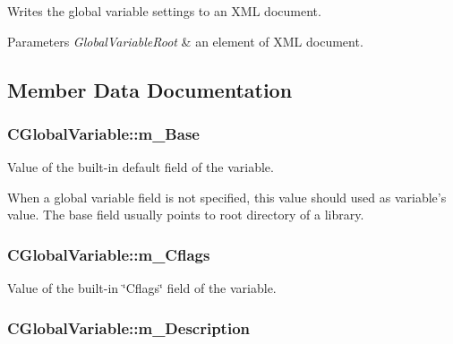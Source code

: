 Writes the global variable settings to an X\-M\-L document. 


\begin{DoxyParams}{Parameters}
{\em Global\-Variable\-Root} & an element of X\-M\-L document. \\
\hline
\end{DoxyParams}


\subsection{Member Data Documentation}
\hypertarget{classCGlobalVariable_a5b9003628abc6731b802f8991e5d8e0f}{
\subsubsection[{m\-\_\-\-Base}]{\setlength{\rightskip}{0pt plus 5cm}C\-Global\-Variable\-::m\-\_\-\-Base\hspace{0.3cm}{\ttfamily [private]}}}\label{classCGlobalVariable_a5b9003628abc6731b802f8991e5d8e0f}


Value of the built-\/in default field of the variable. 

When a global variable field is not specified, this value should used as variable's value. The base field usually points to root directory of a library. \hypertarget{classCGlobalVariable_a43dab168ec93f8d99a585b266c4db5d4}{
\subsubsection[{m\-\_\-\-Cflags}]{\setlength{\rightskip}{0pt plus 5cm}C\-Global\-Variable\-::m\-\_\-\-Cflags\hspace{0.3cm}{\ttfamily [private]}}}\label{classCGlobalVariable_a43dab168ec93f8d99a585b266c4db5d4}


Value of the built-\/in \char`\"{}\-Cflags\char`\"{} field of the variable. 

\hypertarget{classCGlobalVariable_a5fcfab7b98ac6eac8ef6fcabe29e57c9}{
\subsubsection[{m\-\_\-\-Description}]{\setlength{\rightskip}{0pt plus 5cm}C\-Global\-Variable\-::m\-\_\-\-Description\hspace{0.3cm}{\ttfamily [private]}}}\label{classCGlobalVariable_a5fcfab7b98ac6eac8ef6fcabe29e57c9}


